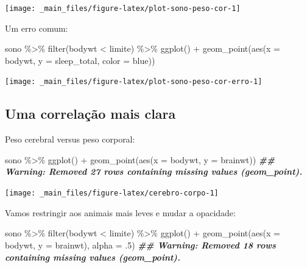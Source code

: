 \documentclass[
  11pt]{report}
\newenvironment{Shaded}{\begin{snugshade}}{\end{snugshade}}
\newcommand{\AttributeTok}[1]{\textcolor[rgb]{0.77,0.63,0.00}{#1}}
\newcommand{\DecValTok}[1]{\textcolor[rgb]{0.00,0.00,0.81}{#1}}
\newcommand{\DocumentationTok}[1]{\textcolor[rgb]{0.56,0.35,0.01}{\textbf{\textit{#1}}}}
\newcommand{\FunctionTok}[1]{\textcolor[rgb]{0.00,0.00,0.00}{#1}}
\newcommand{\NormalTok}[1]{#1}
\newcommand{\SpecialCharTok}[1]{\textcolor[rgb]{0.00,0.00,0.00}{#1}}
\newcommand{\StringTok}[1]{\textcolor[rgb]{0.31,0.60,0.02}{#1}}
\begin{document}
\begin{center}\texttt{[image: \_main\_files/figure-latex/plot-sono-peso-cor-1]} \end{center}

Um erro comum:

\begin{Shaded}
\begin{Highlighting}[]
\NormalTok{sono }\SpecialCharTok{\%\textgreater{}\%} 
  \FunctionTok{filter}\NormalTok{(bodywt }\SpecialCharTok{\textless{}}\NormalTok{ limite) }\SpecialCharTok{\%\textgreater{}\%} 
  \FunctionTok{ggplot}\NormalTok{() }\SpecialCharTok{+}
    \FunctionTok{geom\_point}\NormalTok{(}\FunctionTok{aes}\NormalTok{(}\AttributeTok{x =}\NormalTok{ bodywt, }\AttributeTok{y =}\NormalTok{ sleep\_total, }\AttributeTok{color =} \StringTok{\textquotesingle{}blue\textquotesingle{}}\NormalTok{))}
\end{Highlighting}
\end{Shaded}

\begin{center}\texttt{[image: \_main\_files/figure-latex/plot-sono-peso-cor-erro-1]} \end{center}

\hypertarget{uma-correlauxe7uxe3o-mais-clara}{%
\subsection{Uma correlação mais clara}\label{uma-correlauxe7uxe3o-mais-clara}}

Peso cerebral versus peso corporal:

\begin{Shaded}
\begin{Highlighting}[]
\NormalTok{sono }\SpecialCharTok{\%\textgreater{}\%} 
  \FunctionTok{ggplot}\NormalTok{() }\SpecialCharTok{+}
    \FunctionTok{geom\_point}\NormalTok{(}\FunctionTok{aes}\NormalTok{(}\AttributeTok{x =}\NormalTok{ bodywt, }\AttributeTok{y =}\NormalTok{ brainwt))}
\DocumentationTok{\#\# Warning: Removed 27 rows containing missing values (geom\_point).}
\end{Highlighting}
\end{Shaded}

\begin{center}\texttt{[image: \_main\_files/figure-latex/cerebro-corpo-1]} \end{center}

Vamos restringir aos animais mais leves e mudar a opacidade:

\begin{Shaded}
\begin{Highlighting}[]
\NormalTok{sono }\SpecialCharTok{\%\textgreater{}\%} 
  \FunctionTok{filter}\NormalTok{(bodywt }\SpecialCharTok{\textless{}}\NormalTok{ limite) }\SpecialCharTok{\%\textgreater{}\%} 
  \FunctionTok{ggplot}\NormalTok{() }\SpecialCharTok{+}
    \FunctionTok{geom\_point}\NormalTok{(}\FunctionTok{aes}\NormalTok{(}\AttributeTok{x =}\NormalTok{ bodywt, }\AttributeTok{y =}\NormalTok{ brainwt), }\AttributeTok{alpha =}\NormalTok{ .}\DecValTok{5}\NormalTok{)}
\DocumentationTok{\#\# Warning: Removed 18 rows containing missing values (geom\_point).}
\end{Highlighting}
\end{Shaded}
\end{document}
